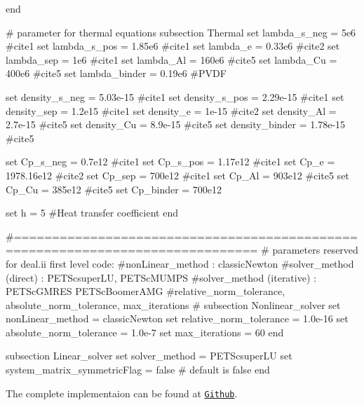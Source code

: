 \begin{DoxyCode}
end

\textcolor{preprocessor}{# parameter for thermal equations}
\textcolor{preprocessor}{}subsection Thermal
set lambda\_s\_neg = 5e6 #cite1
set lambda\_s\_pos = 1.85e6  #cite1
set lambda\_e = 0.33e6  #cite2
set lambda\_sep = 1e6  #cite1
set lambda\_Al = 160e6  #cite5
set lambda\_Cu = 400e6  #cite5
set lambda\_binder = 0.19e6 #PVDF

set density\_s\_neg = 5.03e-15  #cite1
set density\_s\_pos = 2.29e-15  #cite1
set density\_sep = 1.2e15  #cite1
set density\_e = 1e-15  #cite2
set density\_Al = 2.7e-15  #cite5
set density\_Cu = 8.9e-15  #cite5
set density\_binder = 1.78e-15  #cite5

set Cp\_s\_neg = 0.7e12  #cite1
set Cp\_s\_pos = 1.17e12  #cite1
set Cp\_e = 1978.16e12  #cite2
set Cp\_sep = 700e12  #cite1
set Cp\_Al = 903e12  #cite5
set Cp\_Cu = 385e12  #cite5
set Cp\_binder = 700e12 

set h = 5 #Heat transfer coefficient
end
            
                    
\textcolor{preprocessor}{#==============================================================================}
\textcolor{preprocessor}{}\textcolor{preprocessor}{# parameters reserved for deal.ii first level code:}
\textcolor{preprocessor}{}\textcolor{preprocessor}{#nonLinear\_method : classicNewton}
\textcolor{preprocessor}{}\textcolor{preprocessor}{#solver\_method (direct) : PETScsuperLU, PETScMUMPS}
\textcolor{preprocessor}{}\textcolor{preprocessor}{#solver\_method (iterative) : PETScGMRES PETScBoomerAMG}
\textcolor{preprocessor}{}\textcolor{preprocessor}{#relative\_norm\_tolerance, absolute\_norm\_tolerance, max\_iterations}
\textcolor{preprocessor}{}\textcolor{preprocessor}{#}
\textcolor{preprocessor}{}subsection Nonlinear\_solver
        set nonLinear\_method = classicNewton
        set relative\_norm\_tolerance = 1.0e-16
        set absolute\_norm\_tolerance = 1.0e-7
        set max\_iterations = 60
end
                        
subsection Linear\_solver
        set solver\_method = PETScsuperLU
        set system\_matrix\_symmetricFlag = \textcolor{keyword}{false} # \textcolor{keywordflow}{default} is \textcolor{keyword}{false}
end
\end{DoxyCode}
  

 

  The complete implementaion can be found at \href{https://github.com/mechanoChem/mechanoChemFEM/tree/example/Battery%20model%20at%20particle%20scale}{\tt Github}. 
